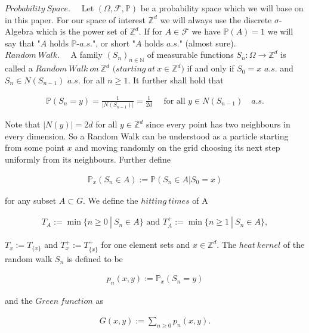\documentclass[12pt,a4paper]{scrartcl}
\numberwithin{equation}{subsection}
\newcommand{\Z}{\mathbb{Z}} %
\newcommand{\1}{\mathbbm{1}}
\numberwithin{equation}{section}
\theoremstyle{definition}
\begin{document}
\noindent $\boldsymbol{\mathit{Probability\ Space}}.\quad$ Let $(\Omega,\mathcal{F}, \mathbb{P})$ be a probability space which we will base on in this paper. For our space of interest $\mathbb{Z}^d$ we will always use the discrete $\sigma$-Algebra which is the power set of $\mathbb{Z}^d$. If for $A\in \mathcal{F}$ we have $\mathbb{P}(A)=1$ we will say that "$A$ holds $\mathbb{P}$-$a.s.$", or short "$A$ holds $a.s.$" (almost sure).
\\

\noindent $\boldsymbol{\mathit{Random\ Walk}}.\quad$ A family $(S_n)_{n\in \mathbb{N}}$ of measurable functions $S_n: \Omega \to \mathbb{Z}^d$ is called a $\mathit{Random\ Walk\ on}\ \mathbb{Z}^d$ $\mathit{(starting\ at}\ x\in \mathbb{Z}^d)$ if and only if $S_0=x$ $a.s.$ and $ S_n\in N(S_{n-1})$ $a.s.$ for all $n\geq 1$. It further shall hold that 

\begin{align*}
	\mathbb{P}(S_n = y) = \frac{1}{|N(S_{n-1})|} = \frac{1}{2d}\quad \text{ for all }  y\in N(S_{n-1})\quad a.s.
\end{align*}

\noindent Note that $|N(y)| = 2d$ for all $y\in \mathbb{Z}^d$ since every point has two neighbours in every dimension. So a Random Walk can be understood as a particle starting from some point $x$ and moving randomly on the grid choosing its next step uniformly from its neighbours. Further define 

\begin{align*}
	\mathbb{P}_x(S_n\in A) := \mathbb{P}(S_n\in A|S_0=x)
\end{align*}

\noindent for any subset $A\subset G$. We define the $hitting\ times$ of A 

\begin{align*}
	T_A := \min \{n\geq 0\ |\ S_n\in A\}\text{ and } T^+_A := \min \{n\geq 1\ |\ S_n\in A\}, 
\end{align*}

\noindent $T_x:= T_{\{x\}}$ and $T^+_x:= T^+_{\{x\}}$ for one element sets and $x\in \Z^d$. The $heat\ kernel$ of the random walk $S_n$ is defined to be 

\begin{align*}
	p_n(x,y):=\mathbb{P}_x(S_n=y)
\end{align*}

\noindent and the $\mathit{Green\ function}$ as 

\begin{align*}
	G(x,y) := \sum_{n\geq 0} p_n(x,y).
\end{align*}
\end{document}
